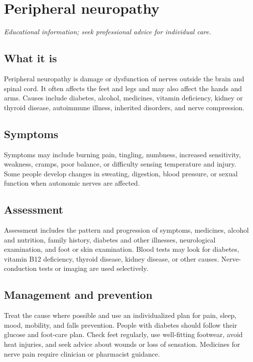 \chapter{Peripheral neuropathy}

\medskip
\noindent\textit{Educational information; seek professional advice for individual care.}

\section*{What it is}
Peripheral neuropathy is damage or dysfunction of nerves outside the brain and spinal cord. It often affects the feet and legs and may also affect the hands and arms. Causes include diabetes, alcohol, medicines, vitamin deficiency, kidney or thyroid disease, autoimmune illness, inherited disorders, and nerve compression.

\section*{Symptoms}
Symptoms may include burning pain, tingling, numbness, increased sensitivity, weakness, cramps, poor balance, or difficulty sensing temperature and injury. Some people develop changes in sweating, digestion, blood pressure, or sexual function when autonomic nerves are affected.

\section*{Assessment}
Assessment includes the pattern and progression of symptoms, medicines, alcohol and nutrition, family history, diabetes and other illnesses, neurological examination, and foot or skin examination. Blood tests may look for diabetes, vitamin B12 deficiency, thyroid disease, kidney disease, or other causes. Nerve-conduction tests or imaging are used selectively.

\section*{Management and prevention}
Treat the cause where possible and use an individualized plan for pain, sleep, mood, mobility, and falls prevention. People with diabetes should follow their glucose and foot-care plan. Check feet regularly, use well-fitting footwear, avoid heat injuries, and seek advice about wounds or loss of sensation. Medicines for nerve pain require clinician or pharmacist guidance.

